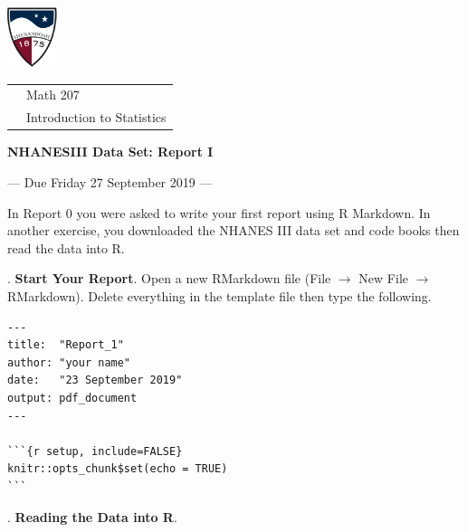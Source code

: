 \documentclass[10pt]{article}
\newcounter{EX}\setcounter{EX}{1}
\newcommand{\EXERCISE}{\arabic{EX}.\stepcounter{EX} }
\begin{document}
\pagestyle{empty}
\lstset{language=R, showspaces=false, showstringspaces=false}

\href{http://www.su.edu}{\includegraphics[height=1.75cm]{sulogo.eps}}
\vspace{-1.69cm}

{\small \hfill
\begin{tabular}{cl}
& Math 207\\& Introduction to Statistics\\
\end{tabular}
}
\setlength{\baselineskip}{1.05\baselineskip}
\medskip
\medskip

\begin{center}
  \textbf{\large   NHANESIII Data Set:  Report I}

  --- Due Friday 27 September 2019 ---
\end{center}

\newcommand{\SUBX}{\smallskip\hspace{10pt}}
\newcommand{\BSK}{\vspace{.14in}}

In Report 0  you were asked to write your first report using R Markdown.
In another exercise, you downloaded the NHANES III data set and code books then
read the data into R.
\medskip

\EXERCISE \textbf{Start Your Report}. Open a new RMarkdown file
(File $\to$ New File $\to$ RMarkdown).  Delete everything in the template file then
type the following.\vspace{-6pt}
\begin{verbatim}
---
title:  "Report_1"
author: "your name"
date:   "23 September 2019"
output: pdf_document
---

```{r setup, include=FALSE}
knitr::opts_chunk$set(echo = TRUE)
```
\end{verbatim}

\EXERCISE \textbf{Reading the Data into R}.
\end{document}
